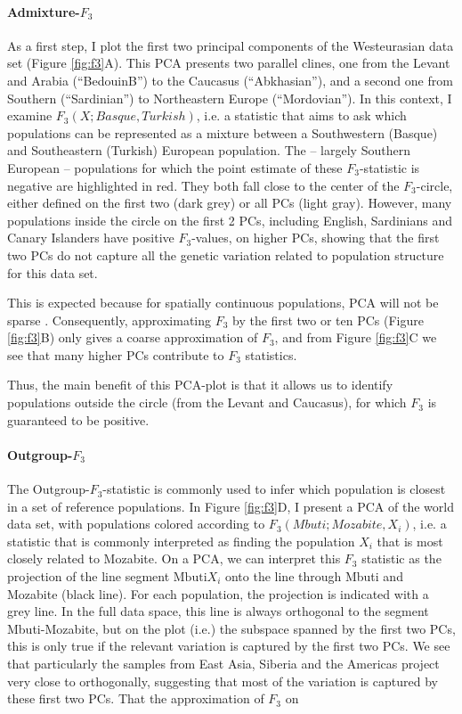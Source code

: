 \documentclass[12pt,a4pape, fullpage]{article}
\begin{document}
\paragraph{Admixture-$F_3$}
As a first step, I plot the first two principal components of the Westeurasian data set (Figure \ref{fig:f3}A). This PCA presents two parallel clines, one from the Levant and Arabia (``BedouinB'') to the Caucasus (``Abkhasian''), and a second one from Southern (``Sardinian'') to Northeastern Europe (``Mordovian''). In this context, I examine $F_3(X; Basque, Turkish)$, i.e. a statistic that aims to ask which populations can be represented as a mixture between a Southwestern (Basque) and Southeastern (Turkish) European population. The -- largely Southern European -- populations for which the point estimate of these $F_3$-statistic is negative are highlighted in red. They both fall close to the center of the $F_3$-circle, either defined on the first two (dark grey) or all PCs (light gray). However, many populations inside the circle on the first 2 PCs, including English, Sardinians and Canary Islanders have positive $F_3$-values, on higher PCs, showing that the first two PCs do not capture all the genetic variation related to population structure for this data set. 

This is expected because for spatially continuous populations, PCA will not be sparse \cite{novembre2008a}.  Consequently, approximating $F_3$ by the first two or ten PCs (Figure \ref{fig:f3}B) only gives a coarse approximation of $F_3$, and from Figure \ref{fig:f3}C we see that many higher PCs contribute to $F_3$ statistics.

Thus, the main benefit of this PCA-plot is that it allows us to identify populations outside the circle (from the Levant and Caucasus), for which $F_3$ is guaranteed to be positive.

\paragraph{Outgroup-$F_3$}
The Outgroup-$F_3$-statistic is commonly used to infer which population is closest in a set of reference populations. In Figure \ref{fig:f3}D, I present a PCA of the world data set, with populations colored according to $F_3(Mbuti; Mozabite, X_i)$, i.e. a statistic that is commonly interpreted as finding the population $X_i$ that is most closely related to Mozabite. On a PCA, we can interpret this $F_3$ statistic as the projection of the line segment $\text{Mbuti}X_i$ onto the line through Mbuti and Mozabite (black line). For each population, the projection is indicated with a grey line. In the full data space, this line is always orthogonal to the segment Mbuti-Mozabite, but on the plot (i.e.) the subspace spanned by the first two PCs, this is only true if the relevant variation is captured by the first two PCs. We see that particularly the samples from East Asia, Siberia and the Americas project very close to orthogonally, suggesting that most of the variation is captured by these first two PCs. That the approximation of $F_3$ on 
\end{document}
